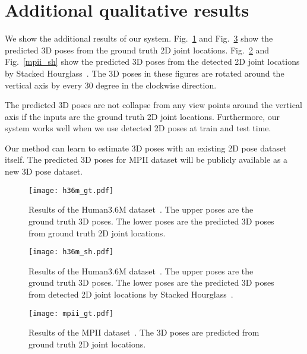\documentclass[runningheads]{llncs}
\newcommand{\Fref}[1]{Fig.~\ref{#1}}
\begin{document}
\section{Additional qualitative results}
We show the additional results of our system.
\Fref{h36m_gt} and \Fref{mpii_gt} show the predicted 3D poses from the ground truth 2D joint locations.
\Fref{h36m_sh} and \Fref{mpii_sh} show the predicted 3D poses from the detected 2D joint locations by Stacked Hourglass~\cite{S_newell}.
The 3D poses in these figures are rotated around the vertical axis by every 30 degree in the clockwise direction.

The predicted 3D poses are not collapse from any view points around the vertical axis if the inputs are the ground truth 2D joint locations.
Furthermore, our system works well when we use detected 2D poses at train and test time.

Our method can learn to estimate 3D poses with an existing 2D pose dataset itself.
The predicted 3D poses for MPII dataset will be publicly available as a new 3D pose dataset.

\begin{figure}[tb]
  \begin{center}
    \texttt{[image: h36m\_gt.pdf]}
    \caption{
    Results of the Human3.6M dataset~\cite{S_h36m}.
    The upper poses are the ground truth 3D poses.
    The lower poses are the predicted 3D poses from ground truth 2D joint locations.
    }
    \label{h36m_gt}
  \end{center}
\end{figure}

\begin{figure}[tb]
  \begin{center}
    \texttt{[image: h36m\_sh.pdf]}
    \caption{
    Results of the Human3.6M dataset~\cite{S_h36m}.
    The upper poses are the ground truth 3D poses.
    The lower poses are the predicted 3D poses from detected 2D joint locations by Stacked Hourglass~\cite{S_newell}.
    }
    \label{h36m_sh}
  \end{center}
\end{figure}

\begin{figure}[tb]
  \begin{center}
    \texttt{[image: mpii\_gt.pdf]}
    \caption{
    Results of the MPII dataset~\cite{S_mpii}.
   	The 3D poses are predicted from ground truth 2D joint locations.
    }
    \label{mpii_gt}
  \end{center}
\end{figure}
\end{document}
